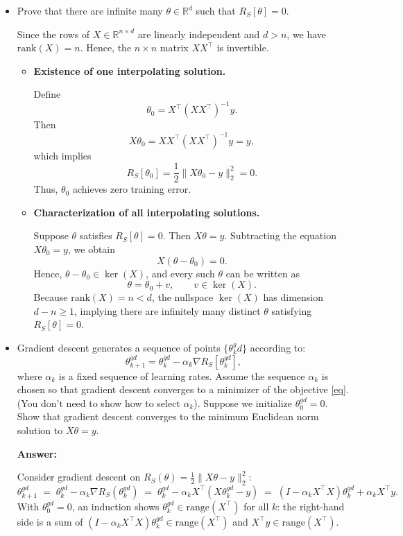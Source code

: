 \documentclass[a4paper]{article}
\begin{document}
\begin{itemize}
    \item Prove that there are infinite many $\theta \in \mathbb{R}^d$ such that $R_S [\theta] = 0.$

Since the rows of $X \in \mathbb{R}^{n \times d}$ are linearly independent and $d > n$, 
we have $\mathrm{rank}(X) = n$. Hence, the $n \times n$ matrix $XX^\top$ is invertible.

\begin{itemize}
    \item \textbf{Existence of one interpolating solution.}
    
    Define
    \[
    \theta_0 = X^\top (XX^\top)^{-1} y.
    \]
    Then
    \[
    X\theta_0 = X X^\top (XX^\top)^{-1} y = y,
    \]
    which implies
    \[
    R_S[\theta_0] = \frac{1}{2}\|X\theta_0 - y\|_2^2 = 0.
    \]
    Thus, $\theta_0$ achieves zero training error.

    \item \textbf{Characterization of all interpolating solutions.}
    
    Suppose $\theta$ satisfies $R_S[\theta] = 0$. Then $X\theta = y$.  
    Subtracting the equation $X\theta_0 = y$, we obtain
    \[
    X(\theta - \theta_0) = 0.
    \]
    Hence, $\theta - \theta_0 \in \ker(X)$, and every such $\theta$ can be written as
    \[
    \theta = \theta_0 + v, \qquad v \in \ker(X).
    \]
    Because $\mathrm{rank}(X) = n < d$, the nullspace $\ker(X)$ has dimension $d - n \ge 1$, 
    implying there are infinitely many distinct $\theta$ satisfying $R_S[\theta] = 0$.
\end{itemize}
    \item Gradient descent generates a sequence of points $\{\theta_k^gd\}$ according to:
        $$\theta_{k+1}^{gd} = \theta_{k}^{gd} - \alpha_k \nabla R_S [\theta_k^{gd}],$$
where $\alpha_k$ is a fixed sequence of learning rates.
Assume the sequence $\alpha_k$ is chosen so that gradient descent converges to a minimizer of the objective \eqref{eq}. (You don’t need to show how to select $\alpha_k$).
Suppose we initialize $\theta_0^{gd} = 0$.
Show that gradient descent converges to the minimum Euclidean norm solution to $X\theta = y$.

\textbf{Answer:}

Consider gradient descent on $R_S(\theta)=\tfrac12\|X\theta-y\|_2^2$:
\[
\theta_{k+1}^{gd} \;=\; \theta_k^{gd} - \alpha_k \nabla R_S(\theta_k^{gd})
\;=\; \theta_k^{gd} - \alpha_k X^\top(X\theta_k^{gd}-y)
\;=\; (I - \alpha_k X^\top X)\theta_k^{gd} + \alpha_k X^\top y.
\]
With $\theta_0^{gd}=0$, an induction shows $\theta_k^{gd}\in \mathrm{range}(X^\top)$ for all $k$:
the right-hand side is a sum of $(I-\alpha_k X^\top X)\theta_k^{gd}\in \mathrm{range}(X^\top)$ and
$X^\top y\in \mathrm{range}(X^\top)$.


\end{itemize}
\end{document}
